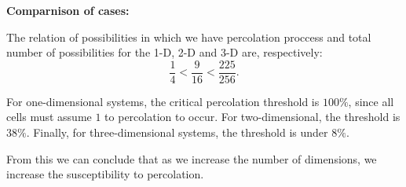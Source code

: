 \textbf{Comparnison of cases:}
\vspace{5mm}

The relation of possibilities in which we have percolation proccess and total
number of possibilities for the 1-D, 2-D and 3-D are, respectively:
\begin{equation}
  \frac{1}{4} < \frac{9}{16} < \frac{225}{256}.
\end{equation}

For one-dimensional systems, the critical percolation threshold is $100 \%$,
since all cells must assume $1$ to percolation to occur. For two-dimensional,
the threshold is $38 \%$. Finally, for three-dimensional systems, the threshold
is under $8 \%$.

\vspace{5mm}
From this we can conclude that as we increase the number of dimensions, we
increase the susceptibility to percolation.
